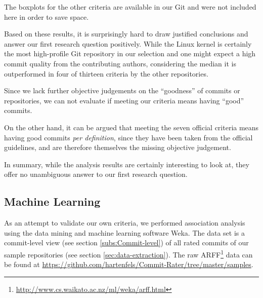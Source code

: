 The boxplots for the other criteria are available in our Git and were not included here in order to save space.

Based on these results, it is surprisingly hard to draw justified conclusions and answer our first research question positively. While the Linux kernel is certainly the most high-profile Git repository in our selection and one might expect a high commit quality from the contributing authors, considering the median it is outperformed in four of thirteen criteria by the other repositories.

Since we lack further objective judgements on the ``goodness'' of commits or repositories, we can not evaluate if meeting our criteria means having ``good'' commits.

On the other hand, it can be argued that meeting the seven official criteria means having good commits \emph{per definition}, since they have been taken from the official guidelines, and are therefore themselves the missing objective judgement.

In summary, while the analysis results are certainly interesting to look at, they offer no unambiguous answer to our first research question.

\subsection{Machine Learning}
\label{sec:results2}

As an attempt to validate our own criteria, we performed association analysis using the data mining and machine learning software Weka\cite{Weka}. The data set is a commit-level view (see section \ref{subs:Commit-level}) of all rated commits of our sample repositories (see section \ref{sec:data-extraction}). The raw ARFF\footnote{\url{http://www.cs.waikato.ac.nz/ml/weka/arff.html}} data can be found at \url{https://github.com/hartenfels/Commit-Rater/tree/master/samples}.

